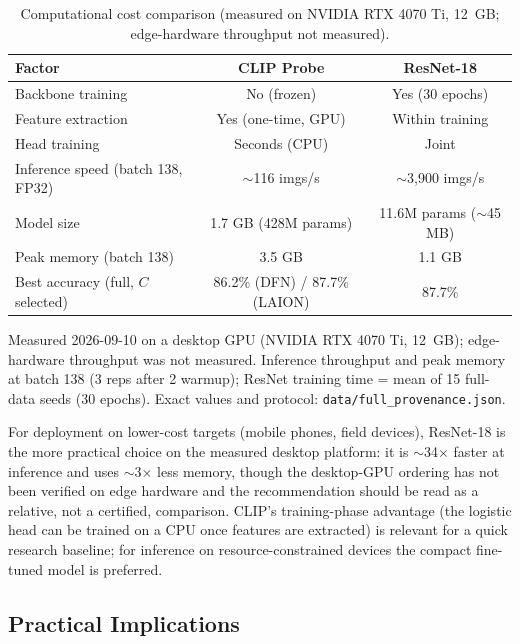 \documentclass[10pt,a4paper]{article}
\begin{document}
\begin{table}[!ht]
\centering
\caption{Computational cost comparison (measured on NVIDIA RTX 4070 Ti, 12~GB; edge-hardware throughput not measured).}
\label{tab:cost}
\small
\begin{tabular}{lcc}
\toprule
\textbf{Factor} & \textbf{CLIP Probe} & \textbf{ResNet-18} \\
\midrule
Backbone training & No (frozen) & Yes (30 epochs) \\
Feature extraction & Yes (one-time, GPU) & Within training \\
Head training & Seconds (CPU) & Joint \\
Inference speed (batch 138, FP32) & $\sim$116 imgs/s & $\sim$3{,}900 imgs/s \\
Model size & 1.7 GB (428M params) & 11.6M params ($\sim$45 MB) \\
Peak memory (batch 138) & 3.5 GB & 1.1 GB \\
\midrule
Best accuracy (full, $C$ selected) & 86.2\% (DFN) / 87.7\% (LAION) & 87.7\% \\
\bottomrule
\end{tabular}
\smallskip
{\small Measured 2026-09-10 on a desktop GPU (NVIDIA RTX 4070 Ti, 12~GB); edge-hardware throughput was not measured. Inference throughput and peak memory at batch 138 (3 reps after 2 warmup); ResNet training time = mean of 15 full-data seeds (30 epochs). Exact values and protocol: \texttt{data/full\_provenance.json}.}
\end{table}

For deployment on lower-cost targets (mobile phones, field devices), ResNet-18 is the more practical choice on the measured desktop platform: it is $\sim$34$\times$ faster at inference and uses $\sim$3$\times$ less memory, though the desktop-GPU ordering has not been verified on edge hardware and the recommendation should be read as a relative, not a certified, comparison.
CLIP's training-phase advantage (the logistic head can be trained on a CPU once features are extracted) is relevant for a quick research baseline; for inference on resource-constrained devices the compact fine-tuned model is preferred.

\subsection{Practical Implications}
\label{sec:practical}
\end{document}
